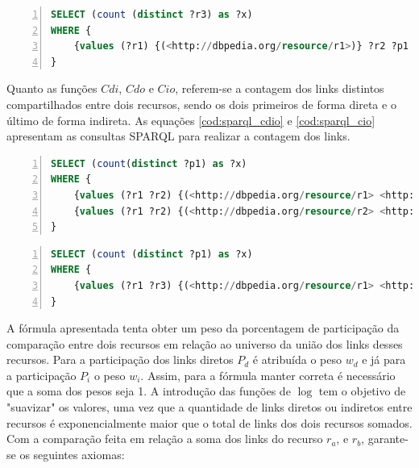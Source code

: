 \begin{lstlisting}[caption=Consulta SPARQL para contagem de links indiretos, language=SQL, frame=single, label={cod:sparql_ci}, float, numbers=left]
SELECT (count (distinct ?r3) as ?x)
WHERE {
	{values (?r1) {(<http://dbpedia.org/resource/r1>)} ?r2 ?p1 ?r1 . ?r2 ?p1 ?r3 . FILTER (?r1 != ?r3) . FILTER (!isLiteral(?r2) )}
}
\end{lstlisting}

Quanto as funções $Cdi$, $Cdo$ e $Cio$, referem-se a contagem dos links distintos compartilhados entre dois recursos, sendo os dois primeiros de forma direta e o último de forma indireta. As equações \ref{cod:sparql_cdio} e \ref{cod:sparql_cio} apresentam as consultas \ac{SPARQL} para realizar a contagem dos links.

\begin{lstlisting}[caption=Consulta SPARQL para contagem de links diretos (saíntes e entrantes) entre dois recursos, language=SQL, frame=single, label={cod:sparql_cdio}, float, numbers=left]
SELECT (count(distinct ?p1) as ?x)
WHERE {
	{values (?r1 ?r2) {(<http://dbpedia.org/resource/r1> <http://dbpedia.org/resource/r2>)} ?r1 ?p1 ?r2 . FILTER (?r1 != ?r2) . FILTER (!isLiteral(?r2)) } UNION
	{values (?r1 ?r2) {(<http://dbpedia.org/resource/r2> <http://dbpedia.org/resource/r1>)} ?r1 ?p1 ?r2 . FILTER (?r1 != ?r2) . FILTER (!isLiteral(?r2)) }
}
\end{lstlisting}

\begin{lstlisting}[caption=Consulta SPARQL para contagem de links indiretos (saíntes) entre dois recursos, language=SQL, frame=single, label={cod:sparql_cio}, float, numbers=left]
SELECT (count (distinct ?p1) as ?x)
WHERE {
	{values (?r1 ?r3) {(<http://dbpedia.org/resource/r1> <http://dbpedia.org/resource/r2>)} ?r2 ?p1 ?r1 . ?r2 ?p1 ?r3 . FILTER (?r1 != ?r3) . FILTER (!isLiteral(?r2) )}
}
\end{lstlisting}

A fórmula apresentada tenta obter um peso da porcentagem de participação da comparação entre dois recursos em relação ao universo da união dos links desses recursos. Para a participação dos links diretos $P_d$ é atribuída o peso $w_d$ e já para a participação $P_i$ o peso $w_i$. Assim, para a fórmula manter correta é necessário que a soma dos pesos seja 1. A introdução das funções de $\log$ tem o objetivo de "suavizar" os valores, uma vez que a quantidade de links diretos ou indiretos entre recursos é exponencialmente maior que o total de links dos dois recursos somados. Com a comparação feita em relação a soma dos links do recurso $r_a$, e $r_b$, garante-se os seguintes axiomas:

